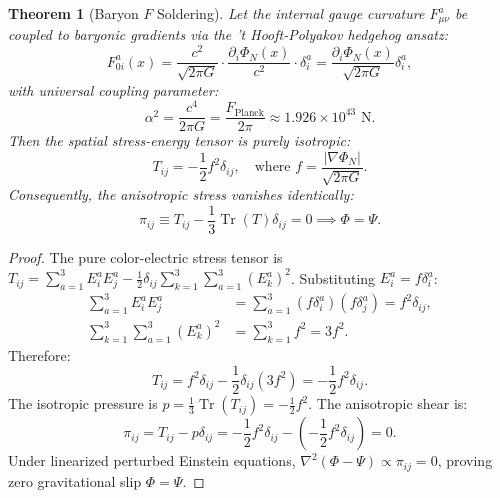 \documentclass[11pt,a4paper]{article}
\theoremstyle{plain}
\newtheorem{theorem}{Theorem}[section]
\theoremstyle{definition}
\theoremstyle{remark}
\begin{document}
\begin{theorem}[Baryon $F$ Soldering]
Let the internal gauge curvature $F_{\mu\nu}^a$ be coupled to baryonic gradients via the 't Hooft-Polyakov hedgehog ansatz:
\begin{equation}
F_{0i}^a(x) = \frac{c^2}{\sqrt{2\pi G}} \cdot \frac{\partial_i \Phi_N(x)}{c^2} \cdot \delta_i^a = \frac{\partial_i \Phi_N(x)}{\sqrt{2\pi G}} \delta_i^a,
\end{equation}
with universal coupling parameter:
\begin{equation}
\alpha^2 = \frac{c^4}{2\pi G} = \frac{F_{\text{Planck}}}{2\pi} \approx 1.926 \times 10^{43}\text{ N}.
\end{equation}
Then the spatial stress-energy tensor is purely isotropic:
\begin{equation}
T_{ij} = -\frac{1}{2} f^2 \delta_{ij}, \quad \text{where } f = \frac{|\nabla \Phi_N|}{\sqrt{2\pi G}}.
\end{equation}
Consequently, the anisotropic stress vanishes identically:
\begin{equation}
\pi_{ij} \equiv T_{ij} - \frac{1}{3} \operatorname{Tr}(T) \delta_{ij} = 0 \implies \Phi = \Psi.
\end{equation}
\end{theorem}

\begin{proof}
The pure color-electric stress tensor is $T_{ij} = \sum_{a=1}^3 E_i^a E_j^a - \frac{1}{2}\delta_{ij} \sum_{k=1}^3 \sum_{a=1}^3 (E_k^a)^2$.
Substituting $E_i^a = f \delta_i^a$:
\begin{align}
\sum_{a=1}^3 E_i^a E_j^a &= \sum_{a=1}^3 (f \delta_i^a)(f \delta_j^a) = f^2 \delta_{ij}, \\
\sum_{k=1}^3 \sum_{a=1}^3 (E_k^a)^2 &= \sum_{k=1}^3 f^2 = 3 f^2.
\end{align}
Therefore:
\begin{equation}
T_{ij} = f^2 \delta_{ij} - \frac{1}{2}\delta_{ij}(3 f^2) = -\frac{1}{2} f^2 \delta_{ij}.
\end{equation}
The isotropic pressure is $p = \frac{1}{3}\operatorname{Tr}(T_{ij}) = -\frac{1}{2} f^2$. The anisotropic shear is:
\begin{equation}
\pi_{ij} = T_{ij} - p \delta_{ij} = -\frac{1}{2} f^2 \delta_{ij} - \left(-\frac{1}{2} f^2 \delta_{ij}\right) = 0.
\end{equation}
Under linearized perturbed Einstein equations, $\nabla^2(\Phi - \Psi) \propto \pi_{ij} = 0$, proving zero gravitational slip $\Phi = \Psi$.
\end{proof}
\end{document}

